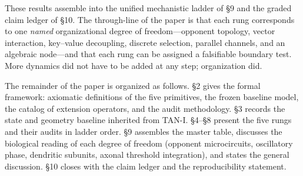 These results assemble into the unified mechanistic ladder of §9 and the
graded claim ledger of §10. The through-line of the paper is that each rung
corresponds to one \emph{named} organizational degree of freedom---opponent
topology, vector interaction, key--value decoupling, discrete selection,
parallel channels, and an algebraic node---and that each rung can be
assigned a falsifiable boundary test. More dynamics did not have to be
added at any step; organization did.

The remainder of the paper is organized as follows. §2 gives the formal
framework: axiomatic definitions of the five primitives, the frozen
baseline model, the catalog of extension operators, and the audit
methodology. §3 records the state and geometry baseline inherited from
TAN-I. §4–§8 present the five rungs and their audits in ladder order.
§9 assembles the master table, discusses the biological reading of each
degree of freedom (opponent microcircuits, oscillatory phase, dendritic
subunits, axonal threshold integration), and states the general discussion.
§10 closes with the claim ledger and the reproducibility statement.
